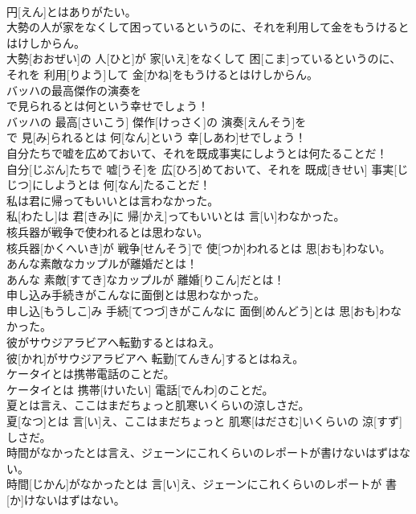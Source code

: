 \documentclass[8pt]{extreport}
\begin{document}
\begin{CJK}{UTF8}{min}
\\	円[えん]とはありがたい。
\\	大勢の人が家をなくして困っているというのに、それを利用して金をもうけるとはけしからん。	
\\	大勢[おおぜい]の 人[ひと]が 家[いえ]をなくして 困[こま]っているというのに、それを 利用[りよう]して 金[かね]をもうけるとはけしからん。
\\	バッハの最高傑作の演奏を
\\	で見られるとは何という幸せでしょう！	
\\	バッハの 最高[さいこう] 傑作[けっさく]の 演奏[えんそう]を 
\\	で 見[み]られるとは 何[なん]という 幸[しあわ]せでしょう！
\\	自分たちで嘘を広めておいて、それを既成事実にしようとは何たることだ！	
\\	自分[じぶん]たちで 嘘[うそ]を 広[ひろ]めておいて、それを 既成[きせい] 事実[じじつ]にしようとは 何[なん]たることだ！
\\	私は君に帰ってもいいとは言わなかった。	
\\	私[わたし]は 君[きみ]に 帰[かえ]ってもいいとは 言[い]わなかった。
\\	核兵器が戦争で使われるとは思わない。	
\\	核兵器[かくへいき]が 戦争[せんそう]で 使[つか]われるとは 思[おも]わない。
\\	あんな素敵なカップルが離婚だとは！	
\\	あんな 素敵[すてき]なカップルが 離婚[りこん]だとは！
\\	申し込み手続きがこんなに面倒とは思わなかった。	
\\	申し込[もうしこ]み 手続[てつづ]きがこんなに 面倒[めんどう]とは 思[おも]わなかった。
\\	彼がサウジアラビアへ転勤するとはねえ。	
\\	彼[かれ]がサウジアラビアへ 転勤[てんきん]するとはねえ。
\\	ケータイとは携帯電話のことだ。	
\\	ケータイとは 携帯[けいたい] 電話[でんわ]のことだ。
\\	夏とは言え、ここはまだちょっと肌寒いくらいの涼しさだ。	
\\	夏[なつ]とは 言[い]え、ここはまだちょっと 肌寒[はださむ]いくらいの 涼[すず]しさだ。
\\	時間がなかったとは言え、ジェーンにこれくらいのレポートが書けないはずはない。	
\\	時間[じかん]がなかったとは 言[い]え、ジェーンにこれくらいのレポートが 書[か]けないはずはない。

\end{CJK}
\end{document}
